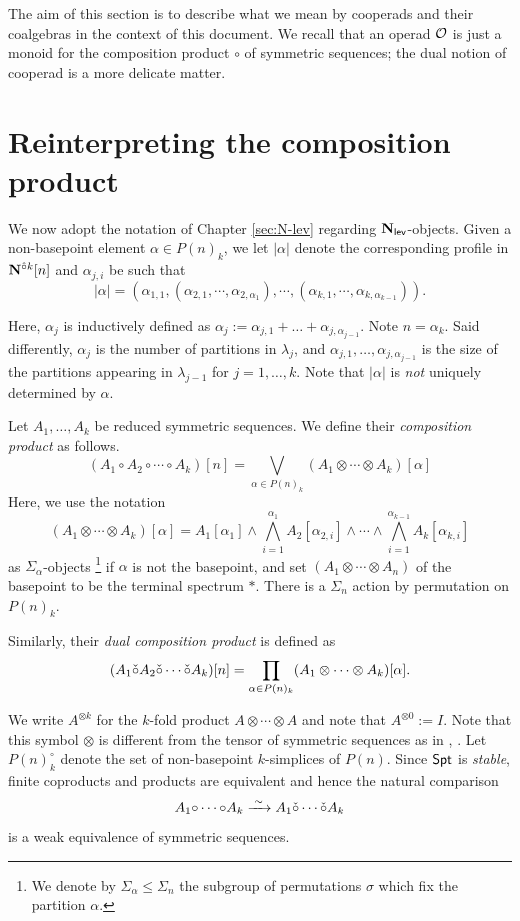 
The aim of this section is to describe what we mean by cooperads and their coalgebras in the context of this document. We recall that an operad $\mathcal{O}$ is just a monoid for the composition product $\circ$ of symmetric sequences; the dual notion of cooperad is a more delicate matter.

\section{Reinterpreting the composition product}
We now adopt the notation of Chapter \ref{sec:N-lev} regarding $\mathbf{N}_{\mathsf{lev}}$-objects. Given a non-basepoint element $\alpha\in P(n)_k$, we let $|\alpha|$ denote the corresponding profile in $\mathbf{N}^{\hat{\circ}k}[n]$ and $\alpha_{j,i}$ be such that \[|\alpha|=\left(\alpha_{1,1}, (\alpha_{2,1},\cdots,\alpha_{2,\alpha_1}), \cdots, (\alpha_{k,1},\cdots,\alpha_{k,\alpha_{k-1}} ) \right).\]

Here, $\alpha_j$ is inductively defined as $\alpha_j :=\alpha_{j,1}+\dots + \alpha_{j,\alpha_{j-1}}$. Note $n=\alpha_k$. Said differently, $\alpha_j$ is the number of partitions in $\lambda_j$, and $\alpha_{j,1},\dots, \alpha_{j,\alpha_{j-1}}$ is the size of the partitions appearing in $\lambda_{j-1}$ for $j=1,\dots,k$. Note that $|\alpha|$ is \textit{not} uniquely determined by $\alpha$. 


\begin{definition} \label{comp-prod} Let $A_1,\dots,A_k$ be reduced symmetric sequences. We define their \textit{composition product} as follows.
\[(A_1{\circ} A_2 {\circ} \cdots {\circ} A_k)[n]=\bigvee_{\alpha\in P(n)_k} (A_1 \otimes \cdots \otimes A_k)[\alpha] \]
Here, we use the notation \[
    (A_1 \otimes \cdots \otimes A_k)[\alpha]=
        A_1[\alpha_1] \wedge \bigwedge_{i=1}^{\alpha_1} A_2[\alpha_{2,i}] \wedge \cdots \wedge \bigwedge_{i=1}^{\alpha_{k-1}} A_k[\alpha_{k,i}]
        \]  as $\Sigma_{\alpha}$-objects \footnote{We denote by $\Sigma_{\alpha}\leq \Sigma_n$ the subgroup of permutations $\sigma$ which fix the partition $\alpha$.} if $\alpha$ is not the basepoint, and set $(A_1\otimes \cdots \otimes A_n)$ of the basepoint to be the terminal spectrum $*$. There is a $\Sigma_n$ action by permutation on $P(n)_k$.

Similarly, their \textit{dual composition product} is defined as \[ (A_1\check{\circ} A_2 \check{\circ} \cdots \check{\circ} A_k)[n]=\prod_{\alpha \in P(n)_k} (A_1 \otimes \cdots \otimes A_k)[\alpha]. \]
\end{definition}

We write $A^{\otimes k}$ for the $k$-fold product $A\otimes \cdots \otimes A$ and note that $A^{\otimes 0}:= I$. Note that this symbol $\otimes$ is different from the tensor of symmetric sequences as in \cite{Rezk-thesis}, \cite{Har-1}. Let $P(n)^{\circ}_k$ denote the set of non-basepoint $k$-simplices of $P(n)$. Since $\mathsf{Spt}$ is \textit{stable}, finite coproducts and products are equivalent and hence the natural comparison \begin{equation} \label{comp} A_1{\circ} \cdots {\circ} A_k\xrightarrow{\;\sim\;} A_1\check{\circ} \cdots \check{\circ} A_k\end{equation} is a weak equivalence of symmetric sequences. 

